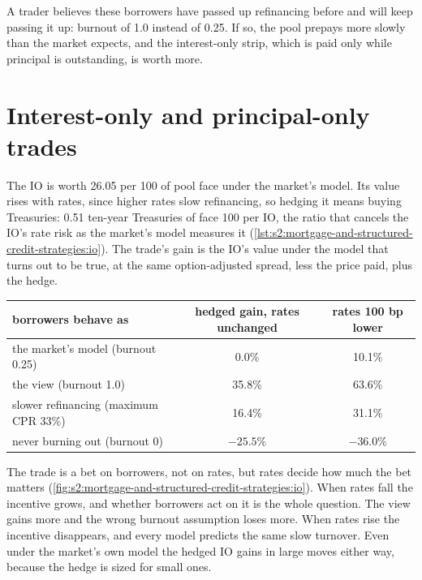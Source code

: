 A trader believes these borrowers have passed up refinancing before and will keep passing it up: burnout of 1.0 instead of 0.25. If so, the pool
prepays more slowly than the market expects, and the interest-only strip, which is paid only while principal is outstanding, is worth more.

\section{Interest-only and principal-only trades}

The IO is worth 26.05 per 100 of pool face under the market's model. Its value rises with rates, since higher rates slow refinancing, so hedging it
means buying Treasuries: 0.51 ten-year Treasuries of face 100 per IO, the ratio that cancels the IO's rate risk as the market's model measures it
(\cref{lst:s2:mortgage-and-structured-credit-strategies:io}). The trade's gain is the IO's value under the model that turns out to be true, at the
same option-adjusted spread, less the price paid, plus the hedge.

\begin{center}
\small
\begin{tabular}{@{}lcc@{}}
\toprule
borrowers behave as & hedged gain, rates unchanged & rates 100 bp lower\\
\midrule
the market's model (burnout 0.25) & 0.0\% & 10.1\%\\
the view (burnout 1.0) & 35.8\% & 63.6\%\\
slower refinancing (maximum CPR 33\%) & 16.4\% & 31.1\%\\
never burning out (burnout 0) & $-25.5\%$ & $-36.0\%$\\
\bottomrule
\end{tabular}
\end{center}

The trade is a bet on borrowers, not on rates, but rates decide how much the bet matters
(\cref{fig:s2:mortgage-and-structured-credit-strategies:io}). When rates fall the incentive grows, and whether borrowers act on it is the whole
question. The view gains more and the wrong burnout assumption loses more. When rates rise the incentive disappears, and every model predicts the same
slow turnover. Even under the market's own model the hedged IO gains in large moves either way, because the hedge is sized for small ones.

